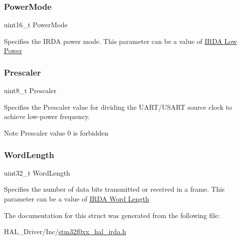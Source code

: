 \subsubsection{\texorpdfstring{Power\+Mode}{PowerMode}}
{\footnotesize\ttfamily uint16\+\_\+t Power\+Mode}

Specifies the I\+R\+DA power mode. This parameter can be a value of \hyperlink{group___i_r_d_a___low___power}{I\+R\+DA Low Power} \mbox{\label{struct_i_r_d_a___init_type_def_a5c9d1e760b400d2502c03b0391606f90}} 
\subsubsection{\texorpdfstring{Prescaler}{Prescaler}}
{\footnotesize\ttfamily uint8\+\_\+t Prescaler}

Specifies the Prescaler value for dividing the U\+A\+R\+T/\+U\+S\+A\+RT source clock to achieve low-\/power frequency. \begin{DoxyNote}{Note}
Prescaler value 0 is forbidden 
\end{DoxyNote}
\mbox{\label{struct_i_r_d_a___init_type_def_ae5e60b9a021fe0009588fc86c7584a5a}} 
\subsubsection{\texorpdfstring{Word\+Length}{WordLength}}
{\footnotesize\ttfamily uint32\+\_\+t Word\+Length}

Specifies the number of data bits transmitted or received in a frame. This parameter can be a value of \hyperlink{group___i_r_d_a_ex___word___length}{I\+R\+DA Word Length} 

The documentation for this struct was generated from the following file\+:\begin{DoxyCompactItemize}
\item 
H\+A\+L\+\_\+\+Driver/\+Inc/\hyperlink{stm32f0xx__hal__irda_8h}{stm32f0xx\+\_\+hal\+\_\+irda.\+h}\end{DoxyCompactItemize}
